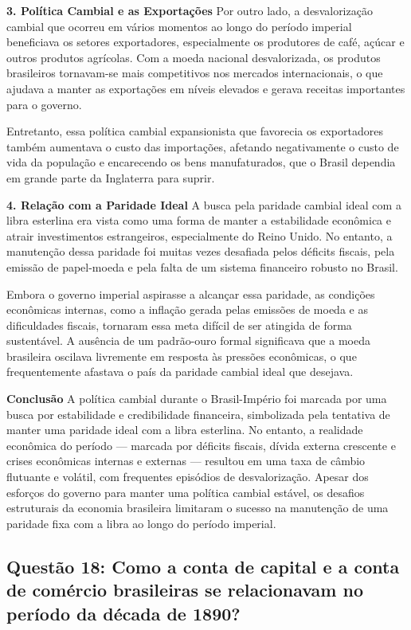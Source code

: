 \documentclass[a4paper,12pt]{article}[abntex2]
\begin{document}
\textbf{3. Política Cambial e as Exportações}
Por outro lado, a desvalorização cambial que ocorreu em vários momentos ao longo do período imperial beneficiava os setores exportadores, especialmente os produtores de café, açúcar e outros produtos agrícolas. Com a moeda nacional desvalorizada, os produtos brasileiros tornavam-se mais competitivos nos mercados internacionais, o que ajudava a manter as exportações em níveis elevados e gerava receitas importantes para o governo.

Entretanto, essa política cambial expansionista que favorecia os exportadores também aumentava o custo das importações, afetando negativamente o custo de vida da população e encarecendo os bens manufaturados, que o Brasil dependia em grande parte da Inglaterra para suprir.

\textbf{4. Relação com a Paridade Ideal}
A busca pela paridade cambial ideal com a libra esterlina era vista como uma forma de manter a estabilidade econômica e atrair investimentos estrangeiros, especialmente do Reino Unido. No entanto, a manutenção dessa paridade foi muitas vezes desafiada pelos déficits fiscais, pela emissão de papel-moeda e pela falta de um sistema financeiro robusto no Brasil.

Embora o governo imperial aspirasse a alcançar essa paridade, as condições econômicas internas, como a inflação gerada pelas emissões de moeda e as dificuldades fiscais, tornaram essa meta difícil de ser atingida de forma sustentável. A ausência de um padrão-ouro formal significava que a moeda brasileira oscilava livremente em resposta às pressões econômicas, o que frequentemente afastava o país da paridade cambial ideal que desejava.

\textbf{Conclusão}
A política cambial durante o Brasil-Império foi marcada por uma busca por estabilidade e credibilidade financeira, simbolizada pela tentativa de manter uma paridade ideal com a libra esterlina. No entanto, a realidade econômica do período — marcada por déficits fiscais, dívida externa crescente e crises econômicas internas e externas — resultou em uma taxa de câmbio flutuante e volátil, com frequentes episódios de desvalorização. Apesar dos esforços do governo para manter uma política cambial estável, os desafios estruturais da economia brasileira limitaram o sucesso na manutenção de uma paridade fixa com a libra ao longo do período imperial.

\subsection{\textbf{Questão 18: Como a conta de capital e a conta de comércio brasileiras se relacionavam no período da década de 1890?}}
\end{document}

